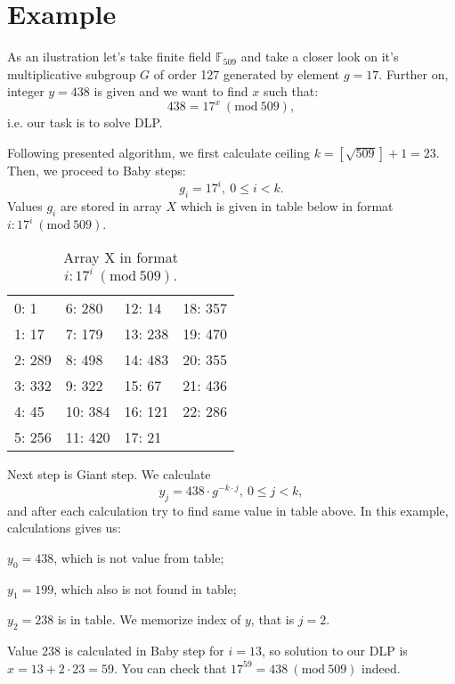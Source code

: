 \documentclass[fleqn,10pt]{olplainarticle}
\begin{document}
\section*{Example}

As an ilustration let's take finite field $\mathbb{F}_{509}$ 
and take a closer look on it's multiplicative subgroup $G$ of 
order 127 generated by element $g=17$. Further on, integer 
$y=438$ is given and we want to find $x$ such that:
$$438=17^x\ (\textrm {mod}\ 509),$$
i.e. our task is to solve DLP.

Following presented algorithm, we first calculate ceiling $k=[\sqrt{509}]+1=23$. Then, we proceed to Baby steps:
$$g_i = 17^i,\ 0\leq i < k.$$
Values $g_i$ are stored in array $X$ which is given in table below in format $i: 17^i\ (\textrm{mod}\ 509).$

\begin{table}[ht]
\centering
\begin{tabular}{|l|l|l|l|}
  0: 1   & 6: 280  & 12: 14 & 18: 357\\
  1: 17  & 7: 179 & 13: 238 & 19: 470 \\
  2: 289 & 8:  498 & 14: 483 & 20: 355\\
  3: 332 & 9:  322 & 15: 67 & 21: 436 \\
  4: 45 & 10: 384 & 16: 121 & 22: 286\\
  5: 256 & 11: 420 & 17: 21 
\end{tabular}
\caption{\label{tab:widgets}Array X in format $i: 17^i\ (\textrm{mod}\ 509).$}
\end{table}


Next step is Giant step. We calculate
$$y_j = 438\cdot g^{-k\cdot j},\ 0\leq j< k,$$
and after each calculation try to find same value in table above. In this example, calculations gives us:

$y_0 = 438$, which is not value from table; 

$y_1 = 199$, which also is not found in table; 

$y_2=238$ is in table. We memorize index of $y$, that is $j=2$.

Value $238$ is calculated in Baby step for $i=13$, so solution 
to our DLP is $x=13+2\cdot 23=59.$ You can check that 
$17^{59}=438\ (\textrm{mod}\ 509)$ indeed.
\end{document}
